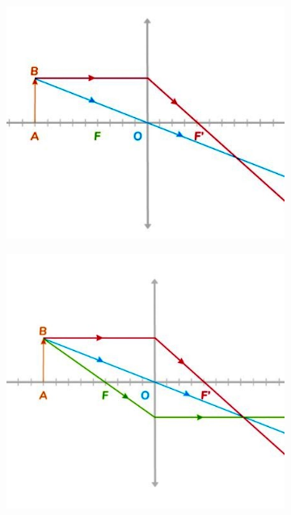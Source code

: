 \documentclass[11pt,a4paper]{article}
\begin{document}
\begin{figure}[ht]
\begin{subfigure}{.18\textwidth}
  \includegraphics[width=.95\linewidth]{imgs/p6/constrct3.jpg}  
\end{subfigure}
\begin{subfigure}{.18\textwidth}
  \centering
  \includegraphics[width=.95\linewidth]{imgs/p6/constrct4.jpg}  
\end{subfigure}
\begin{subfigure}{.18\textwidth}
  \centering

\end{subfigure}
\end{figure}
\end{document}
